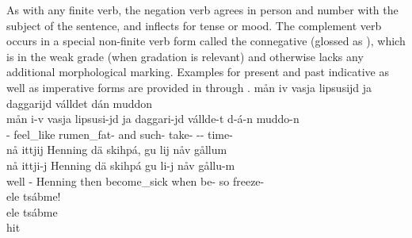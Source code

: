 As with any finite verb, the negation verb agrees in person and number with the subject of the sentence, and inflects for tense or mood. The complement verb occurs in a special non-finite verb form called the connegative (glossed as \mbox{\CONNEGs}), which is in the weak grade (when gradation is relevant) and otherwise lacks any additional morphological marking. Examples for present and past indicative as well as imperative forms are provided in  through . 
\ea\label{connegEx1}%
\glll	mån iv vasja lipsusijd ja daggarijd válldet dán muddon\\
	mån i-v vasja lipsusi-jd ja daggari-jd vállde-t d-á-n muddo-n\\
	 - feel\_like\BS{} rumen\_fat- and such- take- -- time-\\\nopagebreak
{}	
\z
\ea\label{connegEx2}%
\glll	nå ittjij Henning dä skihpá, gu lij nåv gållum\\
	nå ittji-j Henning dä skihpá gu li-j nåv gållu-m\\
	well - Henning\BS{} then become\_sick\BS{} when be- so freeze-\\\nopagebreak
{}	
\z
\ea\label{negImpEx1}%
\glll	ele tsábme!\\
	ele tsábme\\
	\BS{} hit\BS{}\\\nopagebreak
{}	
\z




